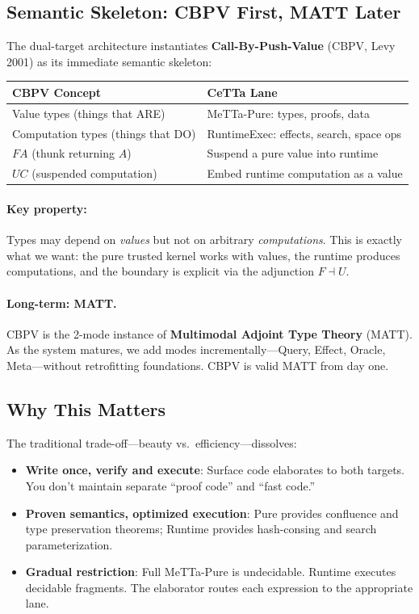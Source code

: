 \documentclass[11pt]{article}
\begin{document}
\subsection{Semantic Skeleton: CBPV First, MATT Later}

The dual-target architecture instantiates \textbf{Call-By-Push-Value}
(CBPV, Levy 2001) as its immediate semantic skeleton:

\begin{center}
\begin{tabular}{ll}
\toprule
\textbf{CBPV Concept} & \textbf{CeTTa Lane} \\
\midrule
Value types (things that ARE) & MeTTa-Pure: types, proofs, data \\
Computation types (things that DO) & RuntimeExec: effects, search, space ops \\
$F A$ (thunk returning $A$) & Suspend a pure value into runtime \\
$U C$ (suspended computation) & Embed runtime computation as a value \\
\bottomrule
\end{tabular}
\end{center}

\paragraph{Key property:} Types may depend on \emph{values} but not on
arbitrary \emph{computations}.  This is exactly what we want: the pure
trusted kernel works with values, the runtime produces computations,
and the boundary is explicit via the adjunction $F \dashv U$.

\paragraph{Long-term: MATT.}
CBPV is the 2-mode instance of \textbf{Multimodal Adjoint Type Theory}
(MATT).  As the system matures, we add modes incrementally---Query,
Effect, Oracle, Meta---without retrofitting foundations.  CBPV is
valid MATT from day one.

\subsection{Why This Matters}

The traditional trade-off---beauty vs.\ efficiency---dissolves:

\begin{itemize}
\item \textbf{Write once, verify and execute}: Surface code elaborates to
  both targets.  You don't maintain separate ``proof code'' and ``fast code.''
\item \textbf{Proven semantics, optimized execution}: Pure provides
  confluence and type preservation theorems; Runtime provides hash-consing
  and search parameterization.
\item \textbf{Gradual restriction}: Full MeTTa-Pure is undecidable.
  Runtime executes decidable fragments.  The elaborator routes each
  expression to the appropriate lane.
\end{itemize}
\end{document}
